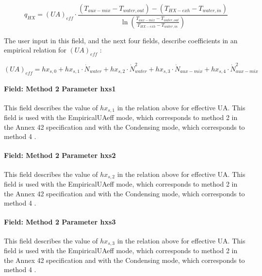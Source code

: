 \begin{equation}
{q_{HX}} = {\left( {UA} \right)_{eff}} \cdot \frac{{\left( {{T_{aux - mix}} - {T_{water,out}}} \right) - \left( {{T_{HX - exh}} - {T_{water,in}}} \right)}}{{\ln \left( {\frac{{{T_{aux - mix}} - {T_{water,out}}}}{{{T_{HX - exh}} - {T_{water,in}}}}} \right)}}
\end{equation}

The user input in this field, and the next four fields, describe coefficients in an empirical relation for \({\left( {UA} \right)_{eff}}\) :

\begin{equation}
{\left( {UA} \right)_{eff}} = h{x_{s,0}} + h{x_{s,1}} \cdot {\dot N_{water}} + h{x_{s,2}} \cdot \dot N_{water}^2 + h{x_{s,3}} \cdot {\dot N_{aux - mix}} + h{x_{s,4}} \cdot \dot N_{aux - mix}^2
\end{equation}

\paragraph{Field: Method 2 Parameter hxs1}\label{field-method-2-parameter-hxs1}

This field describes the value of \(h{x_{s,1}}\) in the relation above for effective UA. This field is used with the EmpiricalUAeff mode, which corresponds to method 2 in the Annex 42 specification and with the Condensing mode, which corresponds to method 4 .

\paragraph{Field: Method 2 Parameter hxs2}\label{field-method-2-parameter-hxs2}

This field describes the value of \(h{x_{s,2}}\) in the relation above for effective UA. This field is used with the EmpiricalUAeff mode, which corresponds to method 2 in the Annex 42 specification and with the Condensing mode, which corresponds to method 4 .

\paragraph{Field: Method 2 Parameter hxs3}\label{field-method-2-parameter-hxs3}

This field describes the value of \(h{x_{s,3}}\) in the relation above for effective UA. This field is used with the EmpiricalUAeff mode, which corresponds to method 2 in the Annex 42 specification and with the Condensing mode, which corresponds to method 4 .

